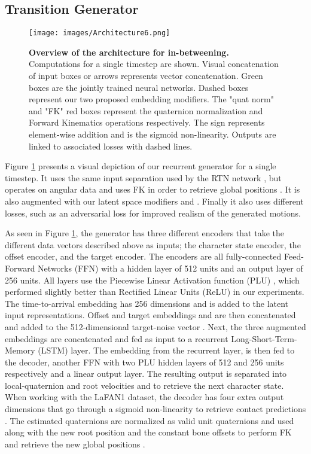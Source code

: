 \documentclass[acmtog]{acmart}
\begin{document}
\subsection{Transition Generator}\label{section:overview}
\begin{figure}[h]
\begin{center}
\texttt{[image: images/Architecture6.png]}
  \caption{\textbf{Overview of the  architecture for in-betweening.} Computations for a single timestep are shown. Visual concatenation of input boxes or arrows represents vector concatenation. Green boxes are the jointly trained neural networks. Dashed boxes represent our two proposed embedding modifiers. The "quat norm" and "FK" red boxes represent the quaternion normalization and Forward Kinematics operations respectively. The  sign represents element-wise addition and  is the sigmoid non-linearity. Outputs are linked to associated losses with dashed lines.}
  \label{fig:overview}
\end{center}
\vspace{-0.5cm}
\end{figure}

Figure \ref{fig:overview} presents a visual depiction of our recurrent generator for a single timestep. It uses the same input separation used by the RTN network \cite{harvey2018recurrent}, but operates on angular data and uses FK in order to retrieve global positions \cite{pavllo2019modeling}. It is also augmented with our latent space modifiers  and . Finally it also uses different losses, such as an adversarial loss for improved realism of the generated motions.

As seen in Figure \ref{fig:overview}, the generator has three different encoders that take the different data vectors described above as inputs; the character state encoder, the offset encoder, and the target encoder. The encoders are all fully-connected Feed-Forward Networks (FFN) with a hidden layer of 512 units and an output layer of 256 units. All layers use the Piecewise Linear Activation function (PLU) \cite{nicolae2018plu}, which performed slightly better than Rectified Linear Units (ReLU) in our experiments. The time-to-arrival embedding  has 256 dimensions and is added to the latent input representations. 
Offset and target embeddings  and  are then concatenated and added to the 512-dimensional target-noise vector . 
Next, the three augmented embeddings are concatenated and fed as input to a recurrent Long-Short-Term-Memory (LSTM) layer. The embedding from the recurrent layer,  is then fed to the decoder, another FFN with two PLU hidden layers of 512 and 256 units respectively and a linear output layer. The resulting output is separated into local-quaternion and root velocities  and  to retrieve the next character state. When working with the LaFAN1 dataset, the decoder has four extra output dimensions that go through a sigmoid non-linearity  to retrieve contact predictions .
The estimated quaternions  are normalized as valid unit quaternions and used along with the new root position  and the constant bone offsets  to perform FK and retrieve the new global positions .
\end{document}
